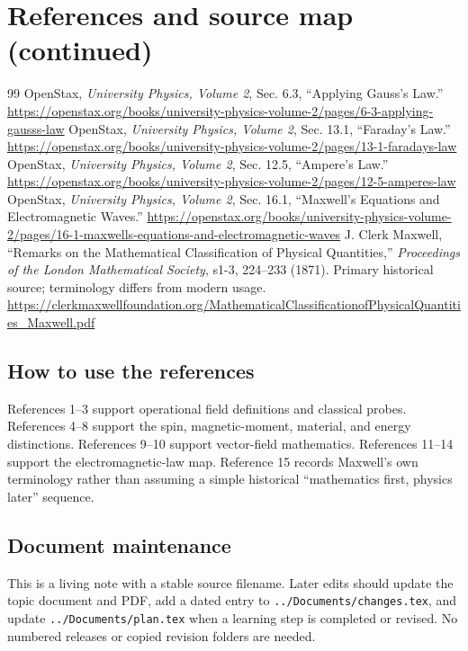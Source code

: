 \documentclass[11pt,letterpaper]{article}
\begin{document}
\section*{References and source map (continued)}
\begingroup\small
\raggedright
\begin{thebibliography}{99}\setcounter{enumiv}{10}
 OpenStax, \emph{University Physics, Volume 2}, Sec. 6.3, ``Applying Gauss's Law.''
\url{https://openstax.org/books/university-physics-volume-2/pages/6-3-applying-gausss-law}
 OpenStax, \emph{University Physics, Volume 2}, Sec. 13.1, ``Faraday's Law.''
\url{https://openstax.org/books/university-physics-volume-2/pages/13-1-faradays-law}
 OpenStax, \emph{University Physics, Volume 2}, Sec. 12.5, ``Ampere's Law.''
\url{https://openstax.org/books/university-physics-volume-2/pages/12-5-amperes-law}
 OpenStax, \emph{University Physics, Volume 2}, Sec. 16.1, ``Maxwell's Equations and Electromagnetic Waves.''
\url{https://openstax.org/books/university-physics-volume-2/pages/16-1-maxwells-equations-and-electromagnetic-waves}
 J. Clerk Maxwell, ``Remarks on the Mathematical Classification of Physical Quantities,'' \emph{Proceedings of the London Mathematical Society}, s1-3, 224--233 (1871). Primary historical source; terminology differs from modern usage.
\url{https://clerkmaxwellfoundation.org/MathematicalClassificationofPhysicalQuantities_Maxwell.pdf}
\end{thebibliography}
\endgroup

\subsection*{How to use the references}
References 1--3 support operational field definitions and classical probes. References 4--8 support the spin, magnetic-moment, material, and energy distinctions. References 9--10 support vector-field mathematics. References 11--14 support the electromagnetic-law map. Reference 15 records Maxwell's own terminology rather than assuming a simple historical ``mathematics first, physics later'' sequence.

\subsection*{Document maintenance}
This is a living note with a stable source filename. Later edits should update the topic document and PDF, add a dated entry to \texttt{../Documents/changes.tex}, and update \texttt{../Documents/plan.tex} when a learning step is completed or revised. No numbered releases or copied revision folders are needed.
\end{document}
